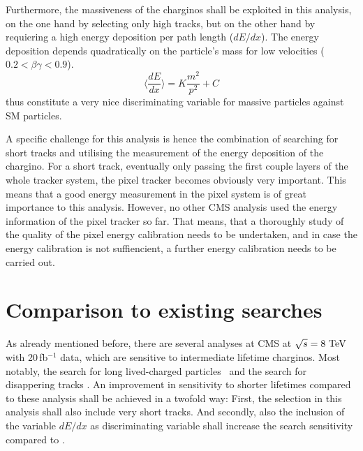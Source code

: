 Furthermore, the massiveness of the charginos shall be exploited in this analysis, on the one hand by selecting only high \pt tracks, but on the other hand by requiering a high energy deposition per path length ($dE/dx$).
The energy deposition depends quadratically on the particle's mass for low velocities ($0.2<\beta\gamma<0.9$).
\begin{equation*}
\langle\frac{dE}{dx}\rangle = K \frac{m^2}{p^2} +C
\end{equation*}
thus constitute a very nice discriminating variable for massive particles against SM particles.
 
A specific challenge for this analysis is hence the combination of searching for short tracks and utilising the measurement of the energy deposition of the chargino.
For a short track, eventually only passing the first couple layers of the whole tracker system, the pixel tracker becomes obviously very important.
This means that a good energy measurement in the pixel system is of great importance to this analysis.
However, no other CMS analysis used the energy information of the pixel tracker so far.
That means, that a thoroughly study of the quality of the pixel energy calibration needs to be undertaken, and in case the energy calibration is not suffiencient, a further energy calibration needs to be carried out.


\section{Comparison to existing searches}
As already mentioned before, there are several analyses at CMS at $\sqrt{s}=8\,\,\text{Te}\kern-0.06667em\text{V}$ with 20\,fb$^{-1}$ data, which are sensitive to intermediate lifetime charginos. 
Most notably, the search for long lived-charged \mbox{particles \cite{bib:CMS:HSCP_8TeV}} and the search for disappering tracks \cite{bib:CMS:DT_8TeV}.
An improvement in sensitivity to shorter lifetimes compared to these analysis shall be achieved in a twofold way:
First, the selection in this analysis shall also include very short tracks.
And secondly, also the inclusion of the variable $dE/dx$ as discriminating variable shall increase the search sensitivity compared to \cite{bib:CMS:DT_8TeV}.


